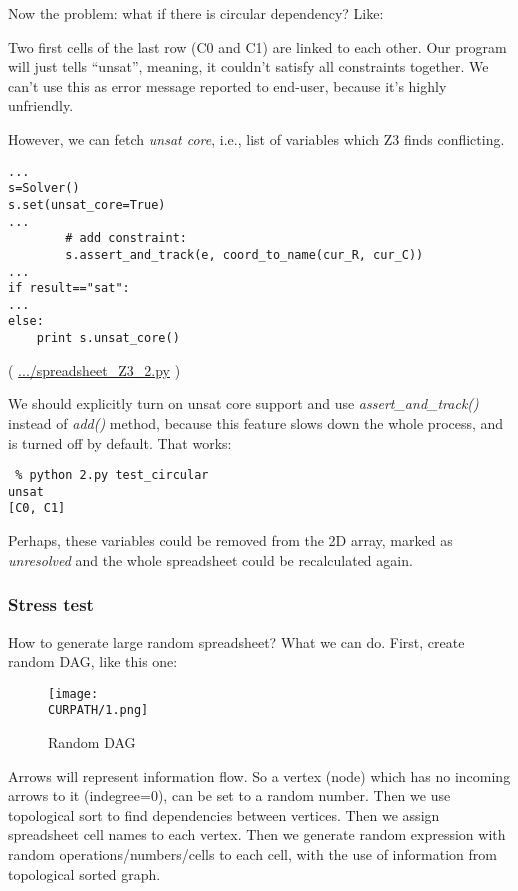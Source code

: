 Now the problem: what if there is circular dependency? Like:



Two first cells of the last row (C0 and C1) are linked to each other.
Our program will just tells ``unsat'', meaning, it couldn't satisfy all constraints together.
We can't use this as error message reported to end-user, because it's highly unfriendly.

However, we can fetch \textit{unsat core}, i.e., list of variables which Z3 finds conflicting.

\begin{lstlisting}
...
s=Solver()
s.set(unsat_core=True)
...
        # add constraint:
        s.assert_and_track(e, coord_to_name(cur_R, cur_C))
...
if result=="sat":
...
else:
    print s.unsat_core()
\end{lstlisting}

( \url{.../spreadsheet_Z3_2.py} )

We should explicitly turn on unsat core support and use \textit{assert\_and\_track()} instead of \textit{add()} method,
because this feature slows down the whole process, and is turned off by default.
That works:

\begin{lstlisting}
 % python 2.py test_circular
unsat
[C0, C1]
\end{lstlisting}

Perhaps, these variables could be removed from the 2D array, marked as \textit{unresolved}
and the whole spreadsheet could be recalculated again.

\subsubsection{Stress test}

How to generate large random spreadsheet?
What we can do.
First, create random \ac{DAG}, like this one:

\begin{figure}[H]
\centering
\texttt{[image: \\CURPATH/1.png]}
\caption{Random DAG}
\end{figure}

Arrows will represent information flow.
So a vertex (node) which has no incoming arrows to it (indegree=0), can be set to a random number.
Then we use topological sort to find dependencies between vertices.
Then we assign spreadsheet cell names to each vertex.
Then we generate random expression with random operations/numbers/cells to each cell,
with the use of information from topological sorted graph.

